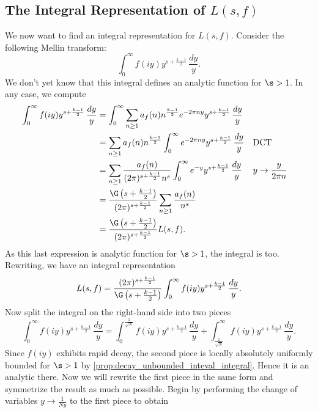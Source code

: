     \subsection*{The Integral Representation of \texorpdfstring{$L(s,f)$}{L(s,f)}}
      We now want to find an integral representation for $L(s,f)$. Consider the following Mellin transform:
      \[
        \int_{0}^{\infty}f(iy)y^{s+\frac{k-1}{2}}\,\frac{dy}{y}.
      \]
      We don't yet know that this integral defines an analytic function for $\s > 1$. In any case, we compute
      \begin{align*}
        \int_{0}^{\infty}f(iy)y^{s+\frac{k-1}{2}}\,\frac{dy}{y} &= \int_{0}^{\infty}\sum_{n \ge 1}a_{f}(n)n^{\frac{k-1}{2}}e^{-2\pi ny}y^{s+\frac{k-1}{2}}\,\frac{dy}{y} \\
        &= \sum_{n \ge 1}a_{f}(n)n^{\frac{k-1}{2}}\int_{0}^{\infty}e^{-2\pi ny}y^{s+\frac{k-1}{2}}\,\frac{dy}{y} &&\text{DCT} \\
        &= \sum_{n \ge 1}\frac{a_{f}(n)}{(2\pi)^{s+\frac{k-1}{2}}n^{s}}\int_{0}^{\infty}e^{-y}y^{s+\frac{k-1}{2}}\,\frac{dy}{y} &&\text{$y \to \frac{y}{2\pi n}$} \\
        &= \frac{\G\left(s+\frac{k-1}{2}\right)}{(2\pi)^{s+\frac{k-1}{2}}}\sum_{n \ge 1}\frac{a_{f}(n)}{n^{s}} \\
        &= \frac{\G\left(s+\frac{k-1}{2}\right)}{(2\pi)^{s+\frac{k-1}{2}}}L(s,f).
      \end{align*}
      As this last expression is analytic function for $\s > 1$, the integral is too. Rewriting, we have an integral representation
      \begin{equation}\label{equ:integral_representation_holomorphic_1}
        L(s,f) = \frac{(2\pi)^{s+\frac{k-1}{2}}}{\G\left(s+\frac{k-1}{2}\right)}\int_{0}^{\infty}f(iy)y^{s+\frac{k-1}{2}}\,\frac{dy}{y}.
      \end{equation}
      Now split the integral on the right-hand side into two pieces
      \begin{equation}\label{equ:symmetric_integral_holomorphic_split}
        \int_{0}^{\infty}f(iy)y^{s+\frac{k-1}{2}}\,\frac{dy}{y} = \int_{0}^{\frac{1}{\sqrt{N}}}f(iy)y^{s+\frac{k-1}{2}}\,\frac{dy}{y}+\int_{\frac{1}{\sqrt{N}}}^{\infty}f(iy)y^{s+\frac{k-1}{2}}\,\frac{dy}{y}.
      \end{equation}
      Since $f(iy)$ exhibits rapid decay, the second piece is locally absolutely uniformly bounded for $\s > 1$ by \cref{prop:decay_unbounded_inteval_integral}. Hence it is an analytic there. Now we will rewrite the first piece in the same form and symmetrize the result as much as possible. Begin by performing the change of variables $y \to \frac{1}{Ny}$ to the first piece to obtain
